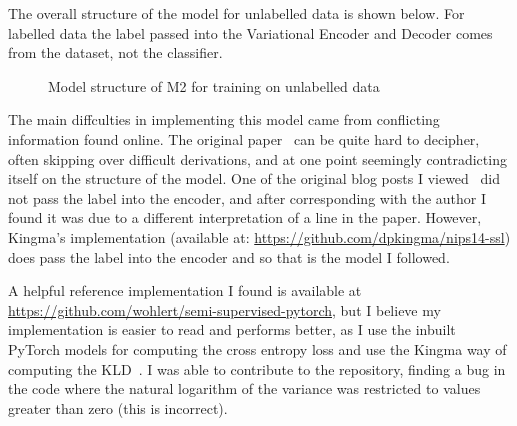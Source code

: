 The overall structure of the model for unlabelled data is shown below. For labelled data the label passed into the Variational Encoder 
and Decoder comes from the dataset, not the classifier.

\begin{figure}[H]
  \centering
  \caption{Model structure of M2 for training on unlabelled data}
\end{figure}

The main diffculties in implementing this model came from conflicting information found online. 
The original paper~\cite{DBLP:journals/corr/KingmaRMW14} can be quite hard to decipher, often skipping over difficult derivations, and 
at one point seemingly contradicting itself on the structure of the model.
One of the original blog posts I viewed~\cite{Semisupe95:online} did not pass the label into the 
encoder, and after corresponding with the author I found it was due to a different interpretation of a line in the paper. However,
Kingma's implementation (available at: \url{https://github.com/dpkingma/nips14-ssl}) does pass the label into the encoder and so that is the 
model I followed. 

A helpful reference implementation I found is available at \url{https://github.com/wohlert/semi-supervised-pytorch}, but I believe my implementation is 
easier to read and performs better, as I use the inbuilt PyTorch models for computing the cross entropy loss and use the Kingma way 
of computing the KLD~\cite{DBLP:journals/corr/KingmaW13}. I was able to contribute to the repository, finding a bug in the 
code where the natural logarithm of the variance was restricted to values greater than zero (this is incorrect).

